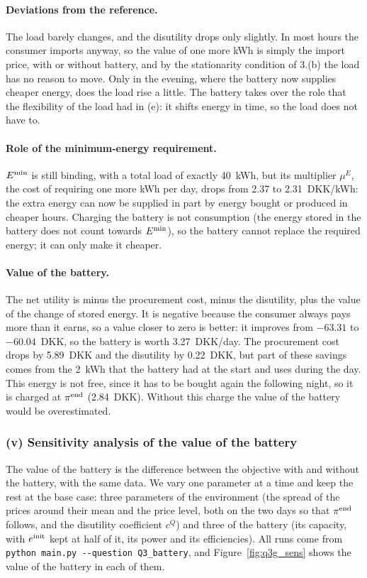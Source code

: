 \paragraph{Deviations from the reference.} The load barely changes, and the disutility drops only
slightly. In most hours the consumer imports anyway, so the value of one more kWh is simply the
import price, with or without battery, and by the stationarity condition of 3.(b) the load has
no reason to move. Only in the evening, where the battery now supplies cheaper energy, does the
load rise a little. The battery takes over the role that the flexibility of the load had in (e):
it shifts energy in time, so the load does not have to.

\paragraph{Role of the minimum-energy requirement.} $E^{\min}$ is still binding, with a total load
of exactly 40~kWh, but its multiplier $\mu^E$, the cost of requiring one more kWh per day,
drops from 2.37 to 2.31~DKK/kWh: the extra energy can now be supplied in part by energy bought
or produced in cheaper hours. Charging the battery is not consumption (the energy stored in the
battery does not count towards $E^{\min}$), so the battery cannot replace the required energy; it can only make it cheaper.

\paragraph{Value of the battery.} The net utility is minus the procurement cost, minus the
disutility, plus the value of the change of stored energy. It is negative because the consumer
always pays more than it earns, so a value closer to zero is better: it improves from $-63.31$
to $-60.04$~DKK, so the battery is worth 3.27~DKK/day. The procurement cost drops by 5.89~DKK
and the disutility by 0.22~DKK, but part of these savings comes from the 2~kWh that the battery
had at the start and uses during the day. This energy is not free, since it has to be bought
again the following night, so it is charged at $\pi^{\mathrm{end}}$ (2.84~DKK). Without this charge the value
of the battery would be overestimated.

\subsubsection{(v) Sensitivity analysis of the value of the battery}
The value of the battery is the difference between the objective with and without the battery,
with the same data. We vary one parameter at a time and keep the rest at the base case: three
parameters of the environment (the spread of the prices around their mean and the price level,
both on the two days so that $\pi^{\mathrm{end}}$ follows, and the disutility coefficient $c^Q$) and three
of the battery (its capacity, with $e^{\mathrm{init}}$ kept at half of it, its power and its efficiencies).
All runs come from \texttt{python main.py -{}-question Q3\_battery}, and
Figure~\ref{fig:q3g_sens} shows the value of the battery in each of them.

